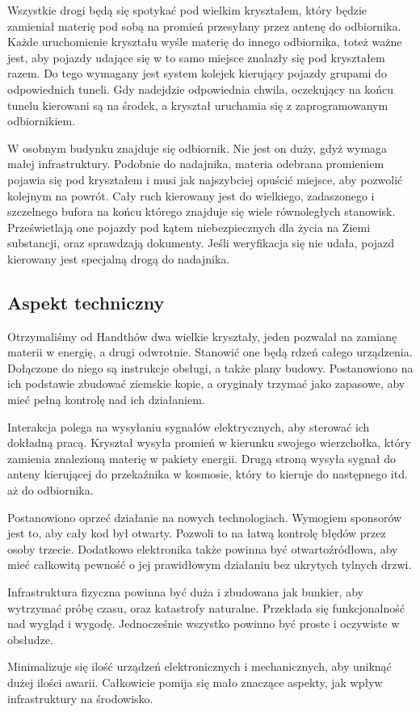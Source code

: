 Wszystkie drogi będą się spotykać pod wielkim kryształem, który będzie zamieniał materię pod sobą na promień przesyłany przez antenę do odbiornika.
Każde uruchomienie kryształu wyśle materię do innego odbiornika, toteż ważne jest, aby pojazdy udające się w to samo miejsce znalazły się pod kryształem razem.
Do tego wymagany jest system kolejek kierujący pojazdy grupami do odpowiednich tuneli.
Gdy nadejdzie odpowiednia chwila, oczekujący na końcu tunelu kierowani są na środek, a kryształ uruchamia się z zaprogramowanym odbiornikiem.

W osobnym budynku znajduje się odbiornik.
Nie jest on duży, gdyż wymaga małej infrastruktury.
Podobnie do nadajnika, materia odebrana promieniem pojawia się pod kryształem i musi jak najszybciej opuścić miejsce, aby pozwolić kolejnym na powrót.
Cały ruch kierowany jest do wielkiego, zadaszonego i szczelnego bufora na końcu którego znajduje się wiele równoległych stanowisk.
Prześwietlają one pojazdy pod kątem niebezpiecznych dla życia na Ziemi substancji, oraz sprawdzają dokumenty.
Jeśli weryfikacja się nie udała, pojazd kierowany jest specjalną drogą do nadajnika.

\subsection{Aspekt techniczny}
Otrzymaliśmy od Handthów dwa wielkie kryształy, jeden pozwalał na zamianę materii w energię, a drugi odwrotnie. 
Stanowić one będą rdzeń całego urządzenia. 
Dołączone do niego są instrukcje obsługi, a także plany budowy.
Postanowiono na ich podstawie zbudować ziemskie kopie, a oryginały trzymać jako zapasowe, aby mieć pełną kontrolę nad ich działaniem.

Interakcja polega na wysyłaniu sygnałów elektrycznych, aby sterować ich dokładną pracą.
Kryształ wysyła promień w kierunku swojego wierzchołka, który zamienia znalezioną materię w pakiety energii.
Drugą stroną wysyła sygnał do anteny kierującej do przekaźnika w kosmosie, który to kieruje do następnego itd. aż do odbiornika.

Postanowiono oprzeć działanie na nowych technologiach.
Wymogiem sponsorów jest to, aby cały kod był otwarty.
Pozwoli to na łatwą kontrolę błędów przez osoby trzecie.
Dodatkowo elektronika także powinna być otwartoźródłowa, aby mieć całkowitą pewność o jej prawidłowym działaniu bez ukrytych tylnych drzwi.

Infrastruktura fizyczna powinna być duża i zbudowana jak bunkier, aby wytrzymać próbę czasu, oraz katastrofy naturalne.
Przekłada się funkcjonalność nad wygląd i wygodę.
Jednocześnie wszystko powinno być proste i oczywiste w obsłudze.

Minimalizuje się ilość urządzeń elektronicznych i mechanicznych, aby uniknąć dużej ilości awarii.
Całkowicie pomija się mało znaczące aspekty, jak wpływ infrastruktury na środowisko.



